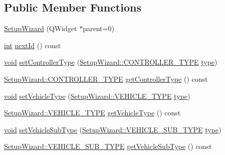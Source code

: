 \subsection*{Public Member Functions}
\begin{DoxyCompactItemize}
\item 
\hyperlink{group___setup_ga8f260c27631b936af1a8e2a9475ae2f0}{Setup\-Wizard} (Q\-Widget $\ast$parent=0)
\item 
\hyperlink{ioapi_8h_a787fa3cf048117ba7123753c1e74fcd6}{int} \hyperlink{group___setup_ga7e04c785013743eebd2ceb833536568d}{next\-Id} () const 
\item 
\hyperlink{group___u_a_v_objects_plugin_ga444cf2ff3f0ecbe028adce838d373f5c}{void} \hyperlink{group___setup_gab45587f98cb648017f85da303efa068c}{set\-Controller\-Type} (\hyperlink{group___vehicle_configuration_source_ga3cfce2b0a501a6fdb7a0ae408ba63556}{Setup\-Wizard\-::\-C\-O\-N\-T\-R\-O\-L\-L\-E\-R\-\_\-\-T\-Y\-P\-E} \hyperlink{glext_8h_a7d05960f4f1c1b11f3177dc963a45d86}{type})
\item 
\hyperlink{group___vehicle_configuration_source_ga3cfce2b0a501a6fdb7a0ae408ba63556}{Setup\-Wizard\-::\-C\-O\-N\-T\-R\-O\-L\-L\-E\-R\-\_\-\-T\-Y\-P\-E} \hyperlink{group___setup_ga1d7c4e20ee0857aef644a2e162ce51e7}{get\-Controller\-Type} () const 
\item 
\hyperlink{group___u_a_v_objects_plugin_ga444cf2ff3f0ecbe028adce838d373f5c}{void} \hyperlink{group___setup_gad78d95f5556264d0ceb480487ffadfb8}{set\-Vehicle\-Type} (\hyperlink{group___vehicle_configuration_source_gaa97253587c69ba0d23535abdc42fad43}{Setup\-Wizard\-::\-V\-E\-H\-I\-C\-L\-E\-\_\-\-T\-Y\-P\-E} \hyperlink{glext_8h_a7d05960f4f1c1b11f3177dc963a45d86}{type})
\item 
\hyperlink{group___vehicle_configuration_source_gaa97253587c69ba0d23535abdc42fad43}{Setup\-Wizard\-::\-V\-E\-H\-I\-C\-L\-E\-\_\-\-T\-Y\-P\-E} \hyperlink{group___setup_gac67d395a98064dde4cd243f78cdef9d4}{get\-Vehicle\-Type} () const 
\item 
\hyperlink{group___u_a_v_objects_plugin_ga444cf2ff3f0ecbe028adce838d373f5c}{void} \hyperlink{group___setup_gaceb7a4422958869c876dd43842e6960c}{set\-Vehicle\-Sub\-Type} (\hyperlink{group___vehicle_configuration_source_gaa22bfa88d750f2b46f66702a723e8342}{Setup\-Wizard\-::\-V\-E\-H\-I\-C\-L\-E\-\_\-\-S\-U\-B\-\_\-\-T\-Y\-P\-E} \hyperlink{glext_8h_a7d05960f4f1c1b11f3177dc963a45d86}{type})
\item 
\hyperlink{group___vehicle_configuration_source_gaa22bfa88d750f2b46f66702a723e8342}{Setup\-Wizard\-::\-V\-E\-H\-I\-C\-L\-E\-\_\-\-S\-U\-B\-\_\-\-T\-Y\-P\-E} \hyperlink{group___setup_ga4ad46c232d39b8e7a4371a812c48e761}{get\-Vehicle\-Sub\-Type} () const 

\end{DoxyCompactItemize}
